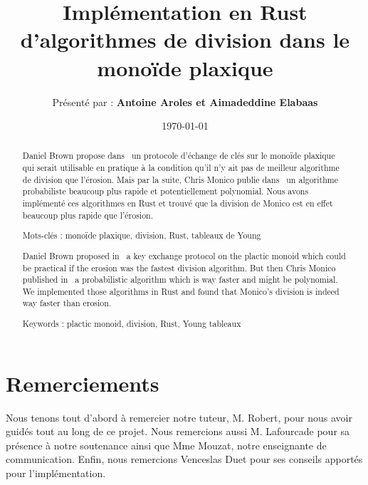 \documentclass[12pt, a4paper, oneside]{memoir}
\title{Implémentation en Rust d'algorithmes de division dans le monoïde plaxique} %
\author{Présenté par : \bfseries{Antoine Aroles} et \bfseries{Aimadeddine Elabaas}}
\date{\today} %
\begin{document}
\frontmatter

\maketitle

\newpage
\chapter{Remerciements}
Nous tenons tout d'abord à remercier notre tuteur, M. Robert, pour nous avoir guidés tout au long de ce projet. Nous remercions aussi M. Lafourcade pour sa présence à notre soutenance ainsi que Mme Mouzat, notre enseignante de communication. Enfin, nous remercions Venceslas Duet pour ses conseils apportés pour l'implémentation.

\newpage
\listoffigures

\newpage
\abstractintoc
\renewcommand\abstractname{R\'esum\'e}
\begin{abstract}
  Daniel Brown propose dans~\cite{brown2021plactic} un protocole d'échange de clés sur le monoïde plaxique qui serait utilisable en pratique à la condition qu'il n'y ait pas de meilleur algorithme de division que l'érosion. Mais par la suite, Chris Monico publie dans~\cite{monico2022division} un algorithme probabiliste beaucoup plus rapide et potentiellement polynomial. Nous avons implémenté ces algorithmes en Rust et trouvé que la division de Monico est en effet beaucoup plus rapide que l'érosion.

 \noindent Mots-clés : monoïde plaxique, division, Rust, tableaux de Young
\end{abstract}

\abstractintoc
\renewcommand\abstractname{Abstract}
\begin{abstract} 
  Daniel Brown proposed in~\cite{brown2021plactic} a key exchange protocol on the plactic monoid which could be practical if the erosion was the fastest division algorithm. But then Chris Monico published in~\cite{monico2022division} a probabilistic algorithm which is way faster and might be polynomial. We implemented those algorithms in Rust and found that Monico's division is indeed way faster than erosion.

  \noindent Keywords : plactic monoid, division, Rust, Young tableaux
\end{abstract}

\newpage
\tableofcontents %
\normalsize
\end{document}
